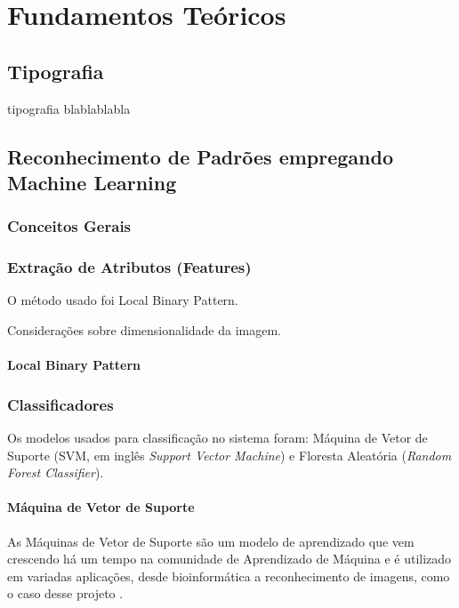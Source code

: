 \chapter{Fundamentos Teóricos}

\section{Tipografia}

tipografia blablablabla

\section{Reconhecimento de Padrões empregando Machine Learning}


\subsection{Conceitos Gerais}

\subsection{Extração de Atributos (Features)}

O método usado foi Local Binary Pattern.

Considerações sobre dimensionalidade da imagem.

\subsubsection{Local Binary Pattern}


\subsection{Classificadores}

Os modelos usados para classificação no sistema foram: Máquina de Vetor de Suporte (SVM, em inglês \textit{Support Vector Machine}) e Floresta Aleatória (\textit{Random Forest Classifier}).

\subsubsection{Máquina de Vetor de Suporte}

As Máquinas de Vetor de Suporte são um modelo de aprendizado que vem crescendo há um tempo na comunidade de Aprendizado de Máquina e é utilizado em variadas aplicações, desde bioinformática a reconhecimento de imagens, como o caso desse projeto   .

